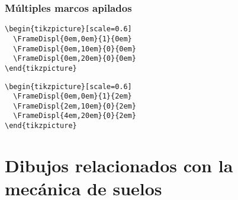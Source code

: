 \documentclass[11pt,letterpaper,oneside]{book}
\begin{document}
\subsection{Múltiples marcos apilados}

\begin{figure}[!htp]
  \centering
  \qquad

  \label{fig:rigi1}
\end{figure}

\begin{lstlisting}[firstnumber=1, title=Dibujo izquierdo]
\begin{tikzpicture}[scale=0.6]
  \FrameDispl{0em,0em}{1}{0em}
  \FrameDispl{0em,10em}{0}{0em}
  \FrameDispl{0em,20em}{0}{0em}
\end{tikzpicture}
\end{lstlisting}

\begin{lstlisting}[firstnumber=1, title=Dibujo derecho]
\begin{tikzpicture}[scale=0.6]
  \FrameDispl{0em,0em}{1}{2em}
  \FrameDispl{2em,10em}{0}{2em}
  \FrameDispl{4em,20em}{0}{2em}
\end{tikzpicture}
\end{lstlisting}


\chapter{Dibujos relacionados con la mecánica de suelos}
\end{document}
